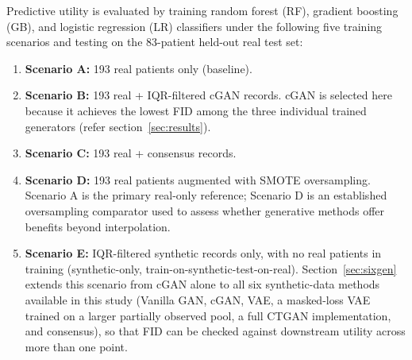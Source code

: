 
Predictive utility is evaluated by training random forest (RF), gradient boosting (GB), and logistic regression (LR) classifiers under the following five training scenarios and testing on the 83-patient held-out real test set:
\begingroup
\begin{enumerate}
\revisioncolor
  \item \textbf{Scenario A:} 193 real patients only (baseline).
  \item \textbf{Scenario B:} 193 real + IQR-filtered cGAN records. cGAN is selected here because it achieves the lowest FID among the three individual trained generators (refer section~\ref{sec:results}).
  \item \textbf{Scenario C:} 193 real + consensus records.
  \item \textbf{Scenario D:} 193 real patients augmented with SMOTE oversampling. Scenario A is the primary real-only reference; Scenario D is an established oversampling comparator used to assess whether generative methods offer benefits beyond interpolation.
  \item \textbf{Scenario E:} IQR-filtered synthetic records only, with no real patients in training (synthetic-only, train-on-synthetic-test-on-real). Section~\ref{sec:sixgen} extends this scenario from cGAN alone to all six synthetic-data methods available in this study (Vanilla GAN, cGAN, VAE, a masked-loss VAE trained on a larger partially observed pool, a full CTGAN implementation, and consensus), so that FID can be checked against downstream utility across more than one point.
\end{enumerate}
\endgroup
{}

